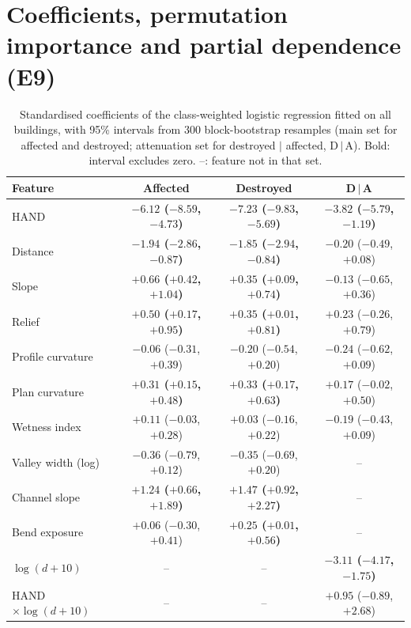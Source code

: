 \documentclass[journal,a4paper]{IEEEtran}
\begin{document}
\section{Coefficients, permutation importance and partial dependence (E9)}\label{app:pdp}
\begin{table}[t]
\centering\footnotesize
\setlength{\tabcolsep}{5pt}
\caption{Standardised coefficients of the class-weighted logistic regression fitted on all buildings, with 95\% intervals from 300 block-bootstrap resamples (main set for affected and destroyed; attenuation set for destroyed $\mid$ affected, D\,$\mid$\,A). Bold: interval excludes zero. --: feature not in that set.}\label{tab:coef}
\begin{tabular}{@{}lccc@{}}
\toprule
\textbf{Feature} & \textbf{Affected} & \textbf{Destroyed} & \textbf{D\,$\mid$\,A}\\
\midrule
HAND & \textbf{$-6.12$ ($-8.59$, $-4.73$)} & \textbf{$-7.23$ ($-9.83$, $-5.69$)} & \textbf{$-3.82$ ($-5.79$, $-1.19$)}\\
Distance & \textbf{$-1.94$ ($-2.86$, $-0.87$)} & \textbf{$-1.85$ ($-2.94$, $-0.84$)} & $-0.20$ ($-0.49$, $+0.08$)\\
Slope & \textbf{$+0.66$ ($+0.42$, $+1.04$)} & \textbf{$+0.35$ ($+0.09$, $+0.74$)} & $-0.13$ ($-0.65$, $+0.36$)\\
Relief & \textbf{$+0.50$ ($+0.17$, $+0.95$)} & \textbf{$+0.35$ ($+0.01$, $+0.81$)} & $+0.23$ ($-0.26$, $+0.79$)\\
Profile curvature & $-0.06$ ($-0.31$, $+0.39$) & $-0.20$ ($-0.54$, $+0.20$) & $-0.24$ ($-0.62$, $+0.09$)\\
Plan curvature & \textbf{$+0.31$ ($+0.15$, $+0.48$)} & \textbf{$+0.33$ ($+0.17$, $+0.63$)} & $+0.17$ ($-0.02$, $+0.50$)\\
Wetness index & $+0.11$ ($-0.03$, $+0.28$) & $+0.03$ ($-0.16$, $+0.22$) & $-0.19$ ($-0.43$, $+0.09$)\\
Valley width (log) & $-0.36$ ($-0.79$, $+0.12$) & $-0.35$ ($-0.69$, $+0.20$) & --\\
Channel slope & \textbf{$+1.24$ ($+0.66$, $+1.89$)} & \textbf{$+1.47$ ($+0.92$, $+2.27$)} & --\\
Bend exposure & $+0.06$ ($-0.30$, $+0.41$) & \textbf{$+0.25$ ($+0.01$, $+0.56$)} & --\\
$\log(d+10)$ & -- & -- & \textbf{$-3.11$ ($-4.17$, $-1.75$)}\\
HAND\,$\times\log(d+10)$ & -- & -- & $+0.95$ ($-0.89$, $+2.68$)\\
\bottomrule
\end{tabular}
\end{table}
\end{document}
